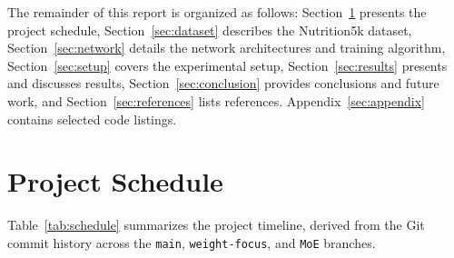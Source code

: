 \documentclass[11pt,a4paper]{article}
\begin{document}
The remainder of this report is organized as follows: Section~\ref{sec:schedule} presents the project schedule, Section~\ref{sec:dataset} describes the Nutrition5k dataset, Section~\ref{sec:network} details the network architectures and training algorithm, Section~\ref{sec:setup} covers the experimental setup, Section~\ref{sec:results} presents and discusses results, Section~\ref{sec:conclusion} provides conclusions and future work, and Section~\ref{sec:references} lists references. Appendix~\ref{sec:appendix} contains selected code listings.

\section{Project Schedule}
\label{sec:schedule}

Table~\ref{tab:schedule} summarizes the project timeline, derived from the Git commit history across the \texttt{main}, \texttt{weight-focus}, and \texttt{MoE} branches.
\end{document}
